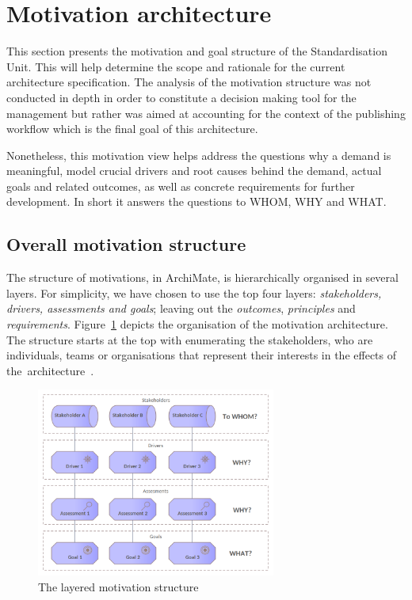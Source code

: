 \section{Motivation architecture}
\label{sec:motivation-architecture}

	This section presents the motivation and goal structure of the Standardisation Unit. This will help determine the scope and rationale for the current architecture specification. The analysis of the motivation structure was not conducted in depth in order to constitute a decision making tool for the management but rather was aimed at accounting for the context of the publishing workflow which is the final goal of this architecture.
	
	Nonetheless, this motivation view helps address the questions why a demand is meaningful, model crucial drivers and root causes behind the demand, actual goals and related outcomes, as well as concrete requirements for further development. In short it answers the questions to WHOM, WHY and WHAT.
	
	\subsection{Overall motivation structure}
	\label{sec:how-to-motivation}		
	
	The structure of motivations, in ArchiMate, is hierarchically organised in several layers. For simplicity, we have chosen to use the top four layers: \textit{stakeholders, drivers, assessments and goals}; leaving out the \textit{outcomes}, \textit{principles} and \textit{requirements}. \mbox{Figure \ref{fig:morivation-structure}} depicts the organisation of the motivation architecture. The structure starts at the top with enumerating the stakeholders, who are individuals, teams or organisations that represent their interests in the effects of \mbox{the architecture \citep{archimate3.1}}. 
	
	\begin{figure}[h]
		\centering
		\includegraphics[width=0.7\textwidth]{images/views/Motivation view.png}
		\caption{The layered motivation structure}
		\label{fig:morivation-structure}
	\end{figure}
	

